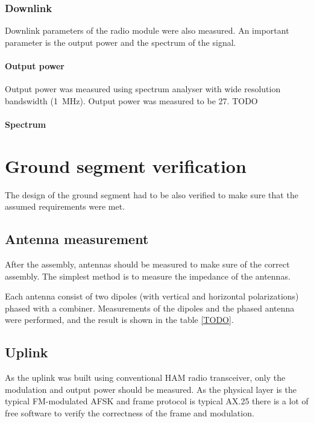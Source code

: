 \subsection{Downlink}
Downlink parameters of the radio module were also measured. An important parameter is the output power and the spectrum of the signal.

\subsubsection{Output power}
Output power was measured using spectrum analyser with wide resolution bandswidth (\SI{1}{\MHz}). Output power was measured to be \SI{27}{\dBm}. TODO

\subsubsection{Spectrum}



\chapter{Ground segment verification}
The design of the ground segment had to be also verified to make sure that the assumed requirements were met.

\section{Antenna measurement}
After the assembly, antennas should be measured to make sure of the correct assembly. The simplest method is to measure the impedance of the antennas.

Each antenna consist of two dipoles (with vertical and horizontal polarizations) phased with a combiner. Measurements of the dipoles and the phased antenna were performed, and the result is shown in the table \ref{TODO}.


\section{Uplink}
As the uplink was built using conventional HAM radio transceiver, only the modulation and output power should be measured. As the physical layer is the typical FM-modulated AFSK and frame protocol is typical AX.25 there is a lot of free software to verify the correctness of the frame and modulation.

